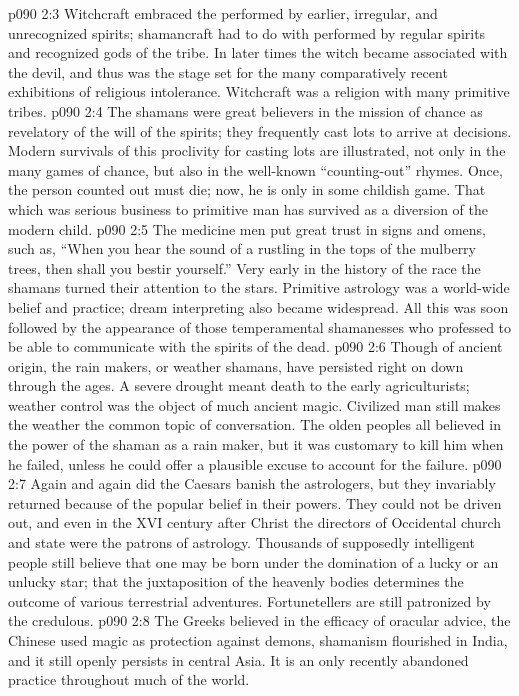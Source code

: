 \vs p090 2:3 Witchcraft embraced the  performed by earlier, irregular, and unrecognized spirits; shamancraft had to do with  performed by regular spirits and recognized gods of the tribe. In later times the witch became associated with the devil, and thus was the stage set for the many comparatively recent exhibitions of religious intolerance. Witchcraft was a religion with many primitive tribes.
\vs p090 2:4 The shamans were great believers in the mission of chance as revelatory of the will of the spirits; they frequently cast lots to arrive at decisions. Modern survivals of this proclivity for casting lots are illustrated, not only in the many games of chance, but also in the well\hyp{}known “counting\hyp{}out” rhymes. Once, the person counted out must die; now, he is only  in some childish game. That which was serious business to primitive man has survived as a diversion of the modern child.
\vs p090 2:5 The medicine men put great trust in signs and omens, such as, “When you hear the sound of a rustling in the tops of the mulberry trees, then shall you bestir yourself.” Very early in the history of the race the shamans turned their attention to the stars. Primitive astrology was a world\hyp{}wide belief and practice; dream interpreting also became widespread. All this was soon followed by the appearance of those temperamental shamanesses who professed to be able to communicate with the spirits of the dead.
\vs p090 2:6 Though of ancient origin, the rain makers, or weather shamans, have persisted right on down through the ages. A severe drought meant death to the early agriculturists; weather control was the object of much ancient magic. Civilized man still makes the weather the common topic of conversation. The olden peoples all believed in the power of the shaman as a rain maker, but it was customary to kill him when he failed, unless he could offer a plausible excuse to account for the failure.
\vs p090 2:7 Again and again did the Caesars banish the astrologers, but they invariably returned because of the popular belief in their powers. They could not be driven out, and even in the XVI century after Christ the directors of Occidental church and state were the patrons of astrology. Thousands of supposedly intelligent people still believe that one may be born under the domination of a lucky or an unlucky star; that the juxtaposition of the heavenly bodies determines the outcome of various terrestrial adventures. Fortunetellers are still patronized by the credulous.
\vs p090 2:8 The Greeks believed in the efficacy of oracular advice, the Chinese used magic as protection against demons, shamanism flourished in India, and it still openly persists in central Asia. It is an only recently abandoned practice throughout much of the world.
